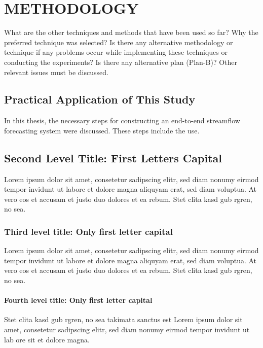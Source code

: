 \chapter{METHODOLOGY}\label{Ch5}

What are the other techniques and methods that have been used so far? Why the preferred technique was selected? Is there any alternative methodology or technique if any problems occur while implementing these techniques or conducting the experiments? Is there any alternative plan (Plan-B)? Other relevant issues must be discussed. 

\section{Practical Application of This Study}

In this thesis, the necessary steps for constructing an end-to-end streamflow forecasting system were discussed. These steps include the use.

\section{Second Level Title: First Letters Capital}

Lorem ipsum dolor sit amet, consetetur sadipscing elitr, sed diam nonumy eirmod tempor invidunt ut labore et dolore magna aliquyam erat, sed diam voluptua. At vero eos et accusam et justo duo dolores et ea rebum. Stet clita kasd gub rgren, no sea.

\subsection{Third level title: Only first letter capital}

Lorem ipsum dolor sit amet, consetetur sadipscing elitr, sed diam nonumy eirmod tempor invidunt ut labore et dolore magna aliquyam erat, sed diam voluptua. At vero eos et accusam et justo duo dolores et ea rebum. Stet clita kasd gub rgren, no sea.

\subsubsection{Fourth level title: Only first letter capital}

Stet clita kasd gub rgren, no sea takimata sanctus est Lorem ipsum dolor sit amet, consetetur sadipscing elitr, sed diam nonumy eirmod tempor invidunt ut lab ore sit et dolore magna.

